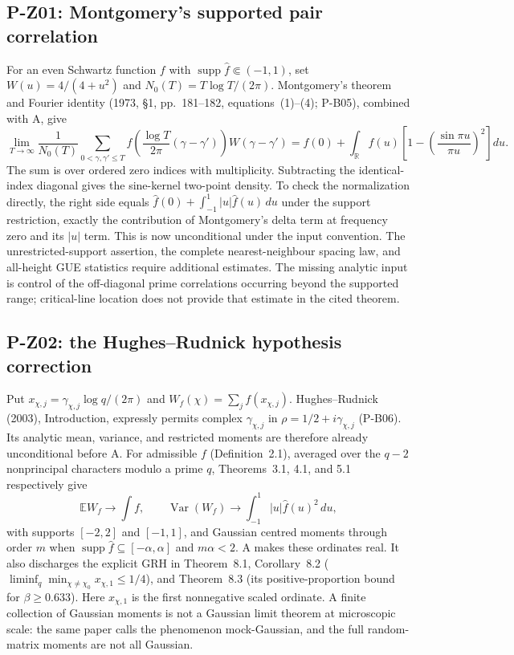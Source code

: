 \documentclass[11pt,a4paper]{article}
\theoremstyle{definition}\newtheorem{definition}{Definition}
\begin{document}
\subsection{P-Z01: Montgomery's supported pair correlation}
For an even Schwartz function $f$ with $\operatorname{supp}\widehat f\Subset(-1,1)$, set $W(u)=4/(4+u^2)$ and $N_0(T)=T\log T/(2\pi)$. Montgomery's theorem and Fourier identity (1973, \S1, pp.~181--182, equations~(1)--(4); P-B05), combined with A, give
\[
 \lim_{T\to\infty}\frac1{N_0(T)}
 \sum_{0<\gamma,\gamma'\le T}
 f\left(\frac{\log T}{2\pi}(\gamma-\gamma')\right)W(\gamma-\gamma')
 = f(0)+\int_{\mathbb R}f(u)\left[1-\left(\frac{\sin\pi u}{\pi u}\right)^2\right]du.
\]
The sum is over ordered zero indices with multiplicity. Subtracting the identical-index diagonal gives the sine-kernel two-point density. To check the normalization directly, the right side equals
$\widehat f(0)+\int_{-1}^1|u|\widehat f(u)\,du$ under the support restriction, exactly the contribution of Montgomery's delta term at frequency zero and its $|u|$ term. This is now unconditional under the input convention. The unrestricted-support assertion, the complete nearest-neighbour spacing law, and all-height GUE statistics require additional estimates. The missing analytic input is control of the off-diagonal prime correlations occurring beyond the supported range; critical-line location does not provide that estimate in the cited theorem.

\subsection{P-Z02: the Hughes--Rudnick hypothesis correction}
Put $x_{\chi,j}=\gamma_{\chi,j}\log q/(2\pi)$ and $W_f(\chi)=\sum_jf(x_{\chi,j})$. Hughes--Rudnick (2003), Introduction, expressly permits complex $\gamma_{\chi,j}$ in $\rho=1/2+i\gamma_{\chi,j}$ (P-B06). Its analytic mean, variance, and restricted moments are therefore already unconditional before A. For admissible $f$ (Definition~2.1), averaged over the $q-2$ nonprincipal characters modulo a prime $q$, Theorems~3.1, 4.1, and 5.1 respectively give
\[
 \mathbb E W_f\longrightarrow\int f,\qquad
 \operatorname{Var}(W_f)\longrightarrow\int_{-1}^1|u|\widehat f(u)^2\,du,
\]
with supports $[-2,2]$ and $[-1,1]$, and Gaussian centred moments through order $m$ when $\operatorname{supp}\widehat f\subseteq[-\alpha,\alpha]$ and $m\alpha<2$. A makes these ordinates real. It also discharges the explicit GRH in Theorem~8.1, Corollary~8.2 ($\liminf_q\min_{\chi\ne\chi_0}x_{\chi,1}\le1/4$), and Theorem~8.3 (its positive-proportion bound for $\beta\ge0.633$). Here $x_{\chi,1}$ is the first nonnegative scaled ordinate. A finite collection of Gaussian moments is not a Gaussian limit theorem at microscopic scale: the same paper calls the phenomenon mock-Gaussian, and the full random-matrix moments are not all Gaussian.
\end{document}
